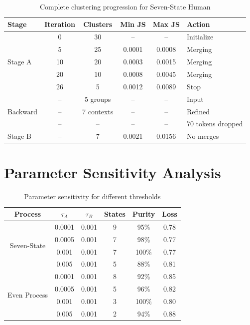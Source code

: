 \documentclass[11pt,a4paper]{report}
\theoremstyle{definition}
\begin{document}
\begin{table}[htbp]
\centering
\caption{Complete clustering progression for Seven-State Human}
\label{tab:seven-state-detailed}
\small
\begin{tabular}{@{}lccccl@{}}
\toprule
\textbf{Stage} & \textbf{Iteration} & \textbf{Clusters} & \textbf{Min JS} & \textbf{Max JS} & \textbf{Action} \\
\midrule
\multirow{5}{*}{Stage A} 
& 0 & 30 & -- & -- & Initialize \\
& 5 & 25 & 0.0001 & 0.0008 & Merging \\
& 10 & 20 & 0.0003 & 0.0015 & Merging \\
& 20 & 10 & 0.0008 & 0.0045 & Merging \\
& 26 & 5 & 0.0012 & 0.0089 & Stop \\
\midrule
\multirow{3}{*}{Backward} 
& -- & 5 groups & -- & -- & Input \\
& -- & 7 contexts & -- & -- & Refined \\
& -- & -- & -- & -- & 70 tokens dropped \\
\midrule
Stage B & -- & 7 & 0.0021 & 0.0156 & No merges \\
\bottomrule
\end{tabular}
\end{table}

\section{Parameter Sensitivity Analysis}

\begin{table}[htbp]
\centering
\caption{Parameter sensitivity for different thresholds}
\label{tab:parameter-sensitivity}
\begin{tabular}{@{}cccccc@{}}
\toprule
\textbf{Process} & \textbf{$\tau_A$} & \textbf{$\tau_B$} & \textbf{States} & \textbf{Purity} & \textbf{Loss} \\
\midrule
\multirow{4}{*}{Seven-State}
& 0.0001 & 0.001 & 9 & 95\% & 0.78 \\
& 0.0005 & 0.001 & 7 & 98\% & 0.77 \\
& \cellcolor{highlightgreen}0.001 & \cellcolor{highlightgreen}0.001 & \cellcolor{highlightgreen}7 & \cellcolor{highlightgreen}100\% & \cellcolor{highlightgreen}0.77 \\
& 0.005 & 0.001 & 5 & 88\% & 0.81 \\
\midrule
\multirow{4}{*}{Even Process}
& 0.0001 & 0.001 & 8 & 92\% & 0.85 \\
& 0.0005 & 0.001 & 5 & 96\% & 0.82 \\
& \cellcolor{highlightgreen}0.001 & \cellcolor{highlightgreen}0.001 & \cellcolor{highlightgreen}3 & \cellcolor{highlightgreen}100\% & \cellcolor{highlightgreen}0.80 \\
& 0.005 & 0.001 & 2 & 94\% & 0.88 \\
\bottomrule
\end{tabular}
\end{table}
\end{document}
